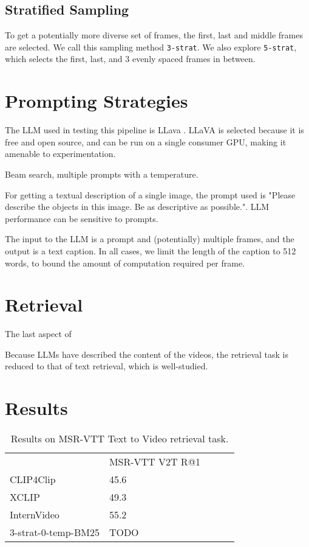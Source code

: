 \documentclass{article}
\begin{document}
\subsection{Stratified Sampling}
To get a potentially more diverse set of frames, the first, last and middle frames are selected.
We call this sampling method \verb|3-strat|. We also explore \verb|5-strat|, which selects the first, last, and 3 evenly spaced frames in between.

\section{Prompting Strategies}

The LLM used in testing this pipeline is LLava \cite{llava}.
LLaVA is selected because it is free and open source, and can be run on a single consumer GPU, making it amenable to experimentation.

Beam search, multiple prompts with a temperature.

For getting a textual description of a single image, the prompt used is "Please describe the objects in this image. Be as descriptive as possible.".
LLM performance can be sensitive to prompts.

The input to the LLM is a prompt and (potentially) multiple frames, and the output is a text caption.
In all cases, we limit the length of the caption to 512 words, to bound the amount of computation required per frame.

\section{Retrieval}

The last aspect of 

Because LLMs have described the content of the videos, the retrieval task is reduced to that of text retrieval, which is well-studied.

\section{Results}

\begin{table}[]
\begin{tabular}{|l|l|lll}
\cline{1-2}
                    & MSR-VTT V2T R@1 &  &  &  \\ \cline{1-2}
CLIP4Clip           & 45.6            &  &  &  \\ \cline{1-2}
XCLIP               & 49.3            &  &  &  \\ \cline{1-2}
InternVideo         & 55.2            &  &  &  \\ \cline{1-2}
3-strat-0-temp-BM25 & TODO            &  &  &  \\ \cline{1-2}
\end{tabular}
\caption{Results on MSR-VTT Text to Video retrieval task.}
\end{table}
\end{document}
